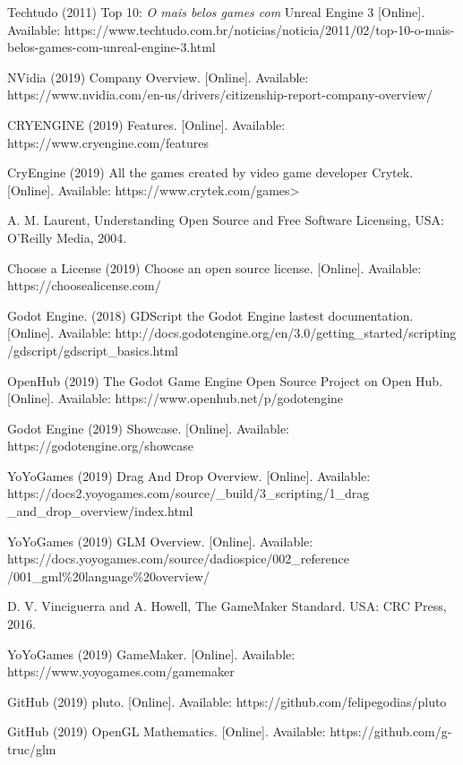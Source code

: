 \begin{thebibliography}{1}
Techtudo (2011) Top 10: \textit{O mais belos games com} Unreal Engine 3 [Online]. Available: https://www.techtudo.com.br/noticias/noticia/2011/02/top-10-o-mais-belos-games-com-unreal-engine-3.html

NVidia (2019) Company Overview. [Online]. Available: https://www.nvidia.com/en-us/drivers/citizenship-report-company-overview/

CRYENGINE (2019) Features. [Online]. Available: https://www.cryengine.com/features

CryEngine (2019) All the games created by video game developer Crytek. [Online]. Available: https://www.crytek.com/games>

A. M. Laurent, Understanding Open Source and Free Software Licensing, USA: O'Reilly Media, 2004.

Choose a License (2019) Choose an open source license. [Online]. Available: https://choosealicense.com/

Godot Engine. (2018) GDScript the Godot Engine lastest documentation. [Online]. Available: http://docs.godotengine.org/en/3.0/getting\_started/scripting
/gdscript/gdscript\_basics.html

OpenHub (2019) The Godot Game Engine Open Source Project on Open Hub. [Online]. Available: https://www.openhub.net/p/godotengine

Godot Engine (2019) Showcase. [Online]. Available: https://godotengine.org/showcase

YoYoGames (2019) Drag And Drop Overview. [Online]. Available: https://docs2.yoyogames.com/source/\_build/3\_scripting/1\_drag
\_and\_drop\_overview/index.html

YoYoGames (2019) GLM Overview. [Online]. Available: https://docs.yoyogames.com/source/dadiospice/002\_reference
/001\_gml\%20language\%20overview/

D. V. Vinciguerra and A. Howell, The GameMaker Standard. USA: CRC Press, 2016.

YoYoGames (2019) GameMaker. [Online]. Available: https://www.yoyogames.com/gamemaker

GitHub (2019) pluto. [Online]. Available: https://github.com/felipegodias/pluto

GitHub (2019) OpenGL Mathematics. [Online]. Available: https://github.com/g-truc/glm


\end{thebibliography}
